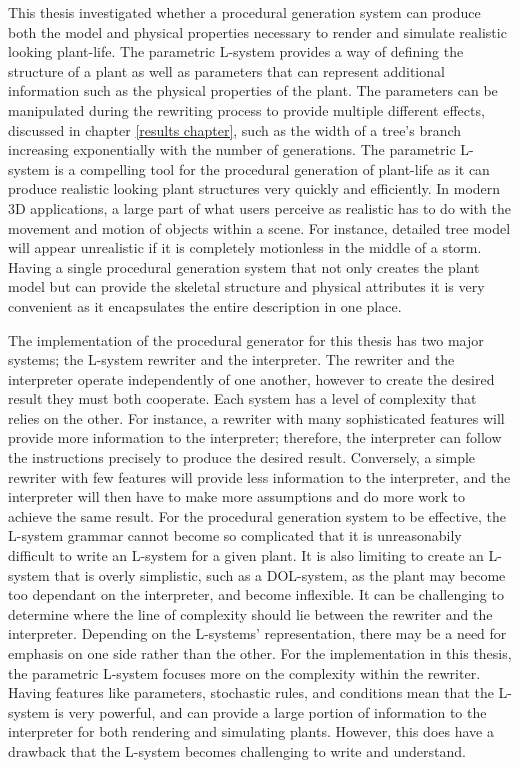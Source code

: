 This thesis investigated whether a procedural generation system can produce both the model and physical properties necessary to render and simulate realistic looking plant-life. The parametric L-system provides a way of defining the structure of a plant as well as parameters that can represent additional information such as the physical properties of the plant. The parameters can be manipulated during the rewriting process to provide multiple different effects, discussed in chapter \ref{results chapter}, such as the width of a tree's branch increasing exponentially with the number of generations. The parametric L-system is a compelling tool for the procedural generation of plant-life as it can produce realistic looking plant structures very quickly and efficiently. In modern 3D applications, a large part of what users perceive as realistic has to do with the movement and motion of objects within a scene. For instance, detailed tree model will appear unrealistic if it is completely motionless in the middle of a storm. Having a single procedural generation system that not only creates the plant model but can provide the skeletal structure and physical attributes it is very convenient as it encapsulates the entire description in one place.

The implementation of the procedural generator for this thesis has two major systems; the L-system rewriter and the interpreter. The rewriter and the interpreter operate independently of one another, however to create the desired result they must both cooperate. Each system has a level of complexity that relies on the other. For instance, a rewriter with many sophisticated features will provide more information to the interpreter; therefore, the interpreter can follow the instructions precisely to produce the desired result. Conversely, a simple rewriter with few features will provide less information to the interpreter, and the interpreter will then have to make more assumptions and do more work to achieve the same result. For the procedural generation system to be effective, the L-system grammar cannot become so complicated that it is unreasonabily difficult to write an L-system for a given plant. It is also limiting to create an L-system that is overly simplistic, such as a DOL-system, as the plant may become too dependant on the interpreter, and become inflexible. It can be challenging to determine where the line of complexity should lie between the rewriter and the interpreter. Depending on the L-systems' representation, there may be a need for emphasis on one side rather than the other. For the implementation in this thesis, the parametric L-system focuses more on the complexity within the rewriter. Having features like parameters, stochastic rules, and conditions mean that the L-system is very powerful, and can provide a large portion of information to the interpreter for both rendering and simulating plants. However, this does have a drawback that the L-system becomes challenging to write and understand.

